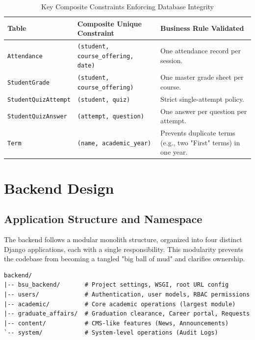 \begin{table}[H]
    \centering
    \renewcommand{\arraystretch}{1.3}
    \begin{tabular}{|p{}|p{}|p{}|}
        \hline
        \textbf{Table} & \textbf{Composite Unique Constraint} & \textbf{Business Rule Validated} \\
        \hline
        \texttt{Attendance} & \texttt{(student, course\_offering, date)} & One attendance record per session. \\
        \hline
        \texttt{StudentGrade} & \texttt{(student, course\_offering)} & One master grade sheet per course. \\
        \hline
        \texttt{StudentQuizAttempt} & \texttt{(student, quiz)} & Strict single-attempt policy. \\
        \hline
        \texttt{StudentQuizAnswer} & \texttt{(attempt, question)} & One answer per question per attempt. \\
        \hline
        \texttt{Term} & \texttt{(name, academic\_year)} & Prevents duplicate terms (e.g., two "First" terms) in one year. \\
        \hline
    \end{tabular}
    \caption{Key Composite Constraints Enforcing Database Integrity}
    \label{tab:db_constraints}
\end{table}

\section{Backend Design}
\label{sec:backend-design}

\subsection{Application Structure and Namespace}

The backend follows a modular monolith structure, organized into four distinct Django applications, each with a single responsibility. This modularity prevents the codebase from becoming a tangled "big ball of mud" and clarifies ownership.

\begin{verbatim}
backend/
|-- bsu_backend/       # Project settings, WSGI, root URL config
|-- users/             # Authentication, user models, RBAC permissions
|-- academic/          # Core academic operations (largest module)
|-- graduate_affairs/  # Graduation clearance, Career portal, Requests
|-- content/           # CMS-like features (News, Announcements)
`-- system/            # System-level operations (Audit Logs)
\end{verbatim}

